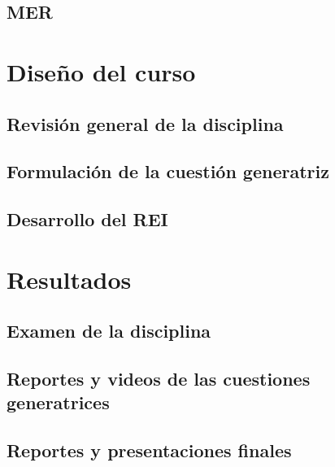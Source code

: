 \documentclass[12pt,spanish,]{book}
\begin{document}
\hypertarget{mer}{%
\section{MER}\label{mer}}

\hypertarget{diseuxf1o-del-curso}{%
\chapter{Diseño del curso}\label{diseuxf1o-del-curso}}

\hypertarget{revisiuxf3n-general-de-la-disciplina}{%
\section{Revisión general de la disciplina}\label{revisiuxf3n-general-de-la-disciplina}}

\hypertarget{formulaciuxf3n-de-la-cuestiuxf3n-generatriz}{%
\section{Formulación de la cuestión generatriz}\label{formulaciuxf3n-de-la-cuestiuxf3n-generatriz}}

\hypertarget{desarrollo-del-rei}{%
\section{Desarrollo del REI}\label{desarrollo-del-rei}}

\hypertarget{resultados}{%
\chapter{Resultados}\label{resultados}}

\hypertarget{examen-de-la-disciplina}{%
\section{Examen de la disciplina}\label{examen-de-la-disciplina}}

\hypertarget{reportes-y-videos-de-las-cuestiones-generatrices}{%
\section{Reportes y videos de las cuestiones generatrices}\label{reportes-y-videos-de-las-cuestiones-generatrices}}

\hypertarget{reportes-y-presentaciones-finales}{%
\section{Reportes y presentaciones finales}\label{reportes-y-presentaciones-finales}}
\end{document}
